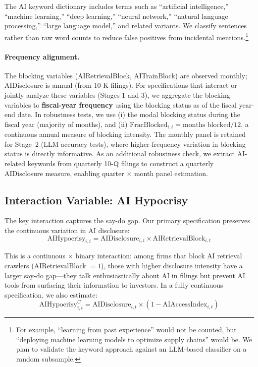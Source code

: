 \documentclass[12pt,a4paper]{article}
\begin{document}
The AI keyword dictionary includes terms such as ``artificial intelligence,'' ``machine learning,'' ``deep learning,'' ``neural network,'' ``natural language processing,'' ``large language model,'' and related variants. We classify sentences rather than raw word counts to reduce false positives from incidental mentions.\footnote{For example, ``learning from past experience'' would not be counted, but ``deploying machine learning models to optimize supply chains'' would be. We plan to validate the keyword approach against an LLM-based classifier on a random subsample.}

\paragraph{Frequency alignment.} The blocking variables (AIRetrievalBlock, AITrainBlock) are observed monthly; AIDisclosure is annual (from 10-K filings). For specifications that interact or jointly analyze these variables (Stages 1 and 3), we aggregate the blocking variables to \textbf{fiscal-year frequency} using the blocking status as of the fiscal year-end date. In robustness tests, we use (i) the modal blocking status during the fiscal year (majority of months), and (ii) $\text{FracBlocked}_{i,t} = \text{months blocked}/12$, a continuous annual measure of blocking intensity. The monthly panel is retained for Stage~2 (LLM accuracy tests), where higher-frequency variation in blocking status is directly informative. As an additional robustness check, we extract AI-related keywords from quarterly 10-Q filings to construct a quarterly AIDisclosure measure, enabling quarter $\times$ month panel estimation.

\subsection{Interaction Variable: AI Hypocrisy}

The key interaction captures the say-do gap. Our primary specification preserves the continuous variation in AI disclosure:
\begin{equation}
\text{AIHypocrisy}_{i,t} = \text{AIDisclosure}_{i,t} \times \text{AIRetrievalBlock}_{i,t}
\end{equation}

\noindent This is a continuous $\times$ binary interaction: among firms that block AI retrieval crawlers (AIRetrievalBlock $= 1$), those with higher disclosure intensity have a larger say-do gap---they talk enthusiastically about AI in filings but prevent AI tools from surfacing their information to investors. In a fully continuous specification, we also estimate:
\begin{equation}
\text{AIHypocrisy}^{C}_{i,t} = \text{AIDisclosure}_{i,t} \times (1 - \text{AIAccessIndex}_{i,t})
\end{equation}
\end{document}
